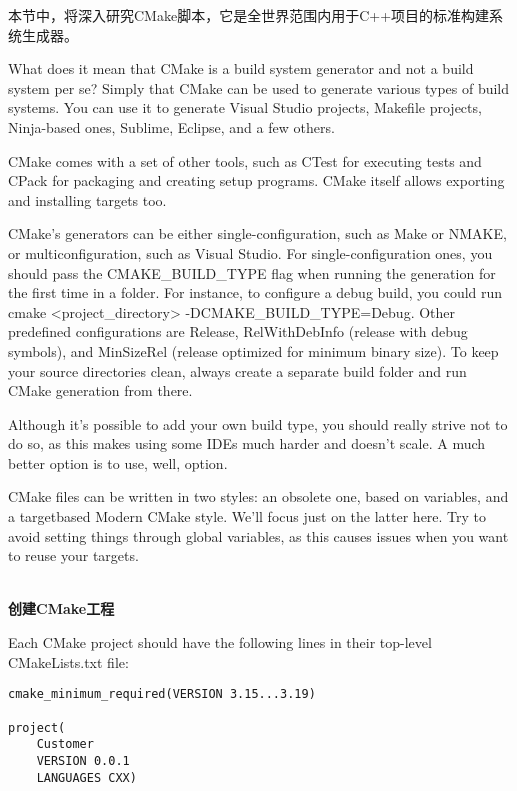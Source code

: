 
本节中，将深入研究CMake脚本，它是全世界范围内用于C++项目的标准构建系统生成器。


What does it mean that CMake is a build system generator and not a build system per se? Simply that CMake can be used to generate various types of build systems. You can use it to generate Visual Studio projects, Makefile projects, Ninja-based ones, Sublime, Eclipse, and a few others.

CMake comes with a set of other tools, such as CTest for executing tests and CPack for packaging and creating setup programs. CMake itself allows exporting and installing targets too.

CMake's generators can be either single-configuration, such as Make or NMAKE, or multiconfiguration, such as Visual Studio. For single-configuration ones, you should pass the CMAKE\_BUILD\_TYPE flag when running the generation for the first time in a folder. For instance, to configure a debug build, you could run cmake <project\_directory> -DCMAKE\_BUILD\_TYPE=Debug. Other predefined configurations are Release, RelWithDebInfo (release with debug symbols), and MinSizeRel (release optimized for minimum binary size). To keep your source directories clean, always create a separate build folder and run CMake generation from there.

Although it's possible to add your own build type, you should really strive not to do so, as this makes using some IDEs much harder and doesn't scale. A much better option is to use, well, option.

CMake files can be written in two styles: an obsolete one, based on variables, and a targetbased Modern CMake style. We'll focus just on the latter here. Try to avoid setting things through global variables, as this causes issues when you want to reuse your targets.

\hspace*{\fill} \\ %
\noindent
\textbf{创建CMake工程}

Each CMake project should have the following lines in their top-level CMakeLists.txt file:

\begin{lstlisting}[style=styleCMake]
cmake_minimum_required(VERSION 3.15...3.19)

project(
	Customer
	VERSION 0.0.1
	LANGUAGES CXX)
\end{lstlisting}

